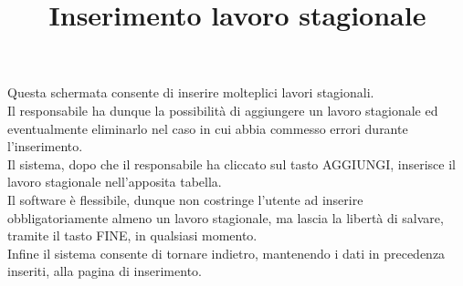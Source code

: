 \documentclass[a4paper,11pt]{article}
\begin{document}
\newpage
\begin{center}
	\title{\textbf{Inserimento lavoro stagionale}}
	\maketitle
\end{center}
Questa schermata consente di inserire molteplici lavori stagionali.\\
Il responsabile ha dunque la possibilità di aggiungere un lavoro stagionale ed eventualmente eliminarlo nel caso in cui abbia commesso errori durante l'inserimento.\\
Il sistema, dopo che il responsabile ha cliccato sul tasto AGGIUNGI, inserisce il lavoro stagionale nell'apposita tabella.\\
Il software è flessibile, dunque non costringe l'utente ad inserire obbligatoriamente almeno un lavoro stagionale, ma lascia la libertà di salvare, tramite il tasto FINE, in qualsiasi momento.\\
Infine il sistema consente di tornare indietro, mantenendo i dati in precedenza inseriti, alla pagina di inserimento.
\end{document}

